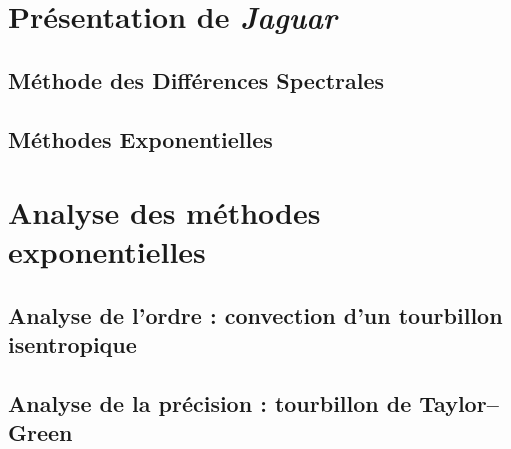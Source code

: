   \section{Présentation de \emph{Jaguar}}
    \subsection{Méthode des Différences Spectrales}
    \subsection{Méthodes Exponentielles}
  \section{Analyse des méthodes exponentielles}
    \subsection{Analyse de l'ordre : convection d'un tourbillon isentropique}
    \subsection{Analyse de la précision : tourbillon de Taylor--Green}








\pagebreak




